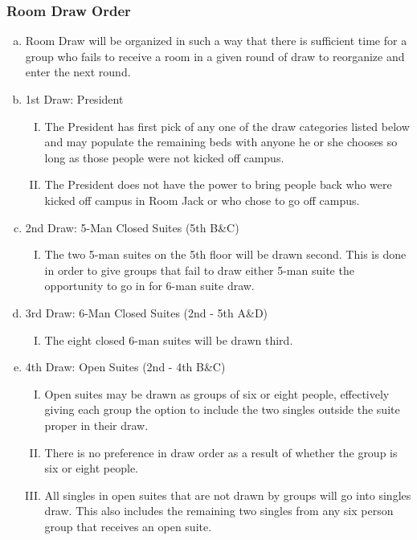 \documentclass[USletter,12pt]{article}
\begin{document}
\begin{enumerate}[(a)]
\subsubsection{Room Draw Order}
\begin{enumerate}[(a)]
\item Room Draw will be organized in such a way that there is sufficient time for a group who fails to receive a room in a given round of draw to reorganize and enter the next round.
\item 1st Draw: President
	\begin{enumerate}[(I)]
	\item The President has first pick of any one of the draw categories listed below and may populate the remaining beds with anyone he or she chooses so long as those people were not kicked off campus.
	\item The President does not have the power to bring people back who were kicked off campus in Room Jack or who chose to go off campus.
	\end{enumerate}
\item 2nd Draw: 5-Man Closed Suites (5th B\&C)
	\begin{enumerate}[(I)]
	\item The two 5-man suites on the 5th floor will be drawn second.  This is done in order to give groups that fail to draw either 5-man suite the opportunity to go in for 6-man suite draw.
	\end{enumerate}
\item 3rd Draw: 6-Man Closed Suites (2nd - 5th A\&D)
	\begin{enumerate}[(I)]
	\item The eight closed 6-man suites will be drawn third.
	\end{enumerate}
\item 4th Draw: Open Suites (2nd - 4th B\&C)
	\begin{enumerate}[(I)]
	\item Open suites may be drawn as groups of six or eight people, effectively giving each group the option to include the two singles outside the suite proper in their draw.
	\item There is no preference in draw order as a result of whether the group is six or eight people.
	\item All singles in open suites that are not drawn by groups will go into singles draw. This also includes the remaining two singles from any six person group that receives an open suite.
	\end{enumerate}

\end{enumerate}
\end{enumerate}
\end{document}
